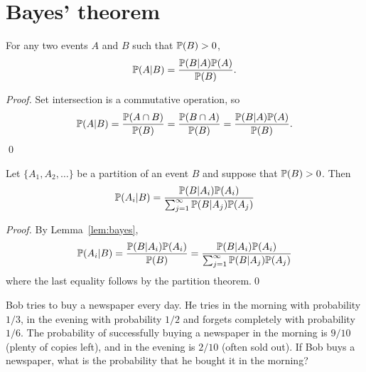 \newpage
\section{Bayes' theorem}

\begin{lemma}\label{lem:bayes}
For any two events $A$ and $B$ such that $\mathbb{P}(B)>0$,
\[
\mathbb{P}(A|B) = \frac{\mathbb{P}(B|A)\mathbb{P}(A)}{\mathbb{P}(B)}.
\]
\end{lemma}

\begin{proof}
Set intersection is a commutative operation, so
\[
\mathbb{P}(A|B) = \frac{\mathbb{P}(A\cap B)}{\mathbb{P}(B)} = \frac{\mathbb{P}(B\cap A)}{\mathbb{P}(B)} = \frac{\mathbb{P}(B|A)\mathbb{P}(A)}{\mathbb{P}(B)}.
\]
\qed
\end{proof}

\break

\begin{theorem}\label{thm:bayes}
Let $\{A_1,A_2,\ldots\}$ be a partition of an event $B$ and suppose that $\mathbb{P}(B)>0$. Then
\[
\mathbb{P}(A_i|B) = \frac{\mathbb{P}(B|A_i)\mathbb{P}(A_i)}{\sum_{j=1}^{\infty} \mathbb{P}(B|A_j)\mathbb{P}(A_j)}
\]
\end{theorem}

\begin{proof}
By Lemma~\ref{lem:bayes},
\[
\mathbb{P}(A_i|B) 
	= \frac{\mathbb{P}(B|A_i)\mathbb{P}(A_i)}{\mathbb{P}(B)}
	= \frac{\mathbb{P}(B|A_i)\mathbb{P}(A_i)}{\sum_{j=1}^{\infty} \mathbb{P}(B|A_j)\mathbb{P}(A_j)}
\]
where the last equality follows by the partition theorem.\qed
\vfill
\end{proof}

\break
\begin{example}
Bob tries to buy a newspaper every day. He tries in the morning with probability $1/3$, in the evening with probability $1/2$ and forgets completely with probability $1/6$. The probability of successfully buying a newspaper in the morning is $9/10$ (plenty of copies left), and in the evening is $2/10$ (often sold out). If Bob buys a newspaper, what is the probability that he bought it in the morning?
\end{example}

